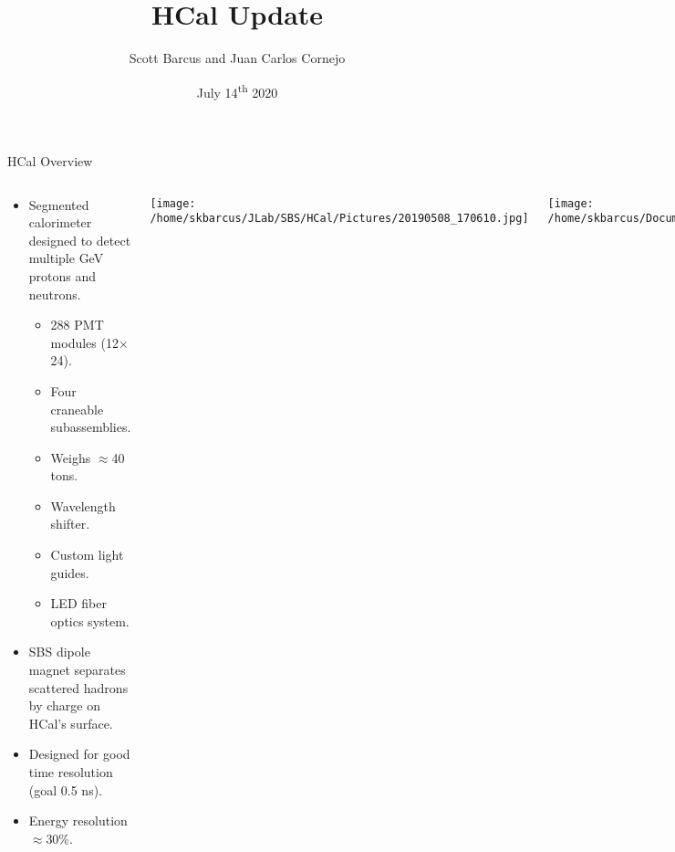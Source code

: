\documentclass[10pt]{beamer}
\title{HCal Update}
\subtitle{}
\date{July 14\textsuperscript{th} 2020}
\author{Scott Barcus and Juan Carlos Cornejo}
\institute{Jefferson Lab}
\begin{document}
\maketitle

\begin{frame}{HCal Overview}

    \begin{columns}[T,onlytextwidth]
  	
  	\begin{center}
  	
	\begin{itemize}
		\item Segmented calorimeter designed to detect multiple GeV protons and neutrons.
		\begin{itemize}\itemsep0pt \parskip0pt 
			\item[--] 288 PMT modules (12$\times$24).
			\item[--] Four craneable subassemblies.
			\item[--] Weighs $\approx$40 tons.
			\item[--] Wavelength shifter.
			\item[--] Custom light guides.
			\item[--] LED fiber optics system.
		\end{itemize}
		\item SBS dipole magnet separates scattered hadrons by charge on HCal's surface.
		\item Designed for \alert{good time resolution} (goal 0.5 ns).
		\item Energy resolution $\approx$30\%.
	\end{itemize}
	
	\end{center}
	
	  \begin{center}
  		\texttt{[image: /home/skbarcus/JLab/SBS/HCal/Pictures/20190508\_170610.jpg]}
  	\end{center}
	\begin{center}
  		\texttt{[image: /home/skbarcus/Documents/JLab\_SS1/Seminar/HCal\_External\_Clean.png]}
  	\end{center}
	\end{columns}

\end{frame}
\end{document}
